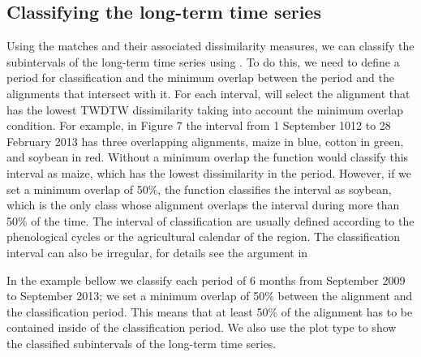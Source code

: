 \documentclass[article,shortnames]{jss}
\begin{document}
\subsection{Classifying the long-term time
series}\label{classifying-the-long-term-time-series}

Using the matches and their associated dissimilarity measures, we can
classify the subintervals of the long-term time series using
. To do this, we need to define a period for
classification and the minimum overlap between the period and the
alignments that intersect with it. For each interval,
 will select the alignment that has the lowest TWDTW
dissimilarity taking into account the minimum overlap condition. For
example, in Figure 7 the interval from 1 September 1012 to 28 February
2013 has three overlapping alignments, maize in blue, cotton in green,
and soybean in red. Without a minimum overlap the function
 would classify this interval as maize, which has
the lowest dissimilarity in the period. However, if we set a minimum
overlap of 50\%, the function  classifies the
interval as soybean, which is the only class whose alignment overlaps
the interval during more than 50\% of the time. The interval of
classification are usually defined according to the phenological cycles
or the agricultural calendar of the region. The classification interval
can also be irregular, for details see the argument  in

In the example bellow we classify each period of 6 months from September
2009 to September 2013; we set a minimum overlap of 50\% between the
alignment and the classification period. This means that at least 50\%
of the alignment has to be contained inside of the classification
period. We also use the plot type  to show the
classified subintervals of the long-term time series.
\end{document}
